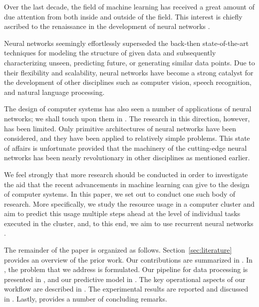 Over the last decade, the field of machine learning has received a great amount
of due attention from both inside and outside of the field. This interest is
chiefly ascribed to the renaissance in the development of neural networks
\cite{goodfellow2016}.

Neural networks seemingly effortlessly superseded the back-then state-of-the-art
techniques for modeling the structure of given data and subsequently
characterizing unseen, predicting future, or generating similar data points. Due
to their flexibility and scalability, neural networks have become a strong
catalyst for the development of other disciplines such as computer vision,
speech recognition, and natural language processing.

The design of computer systems has also seen a number of applications of neural
networks; we shall touch upon them in . The research in this
direction, however, has been limited. Only primitive architectures of neural
networks have been considered, and they have been applied to relatively simple
problems. This state of affairs is unfortunate provided that the machinery of
the cutting-edge neural networks has been nearly revolutionary in other
disciplines as mentioned earlier.

We feel strongly that more research should be conducted in order to investigate
the aid that the recent advancements in machine learning can give to the design
of computer systems. In this paper, we set out to conduct one such body of
research. More specifically, we study the resource usage in a computer cluster
and aim to predict this usage multiple steps ahead at the level of individual
tasks executed in the cluster, and, to this end, we aim to use recurrent neural
networks \cite{goodfellow2016}.

The remainder of the paper is organized as follows. Section~\ref{sec:literature}
provides an overview of the prior work. Our contributions are summarized in
. In , the problem that we address is
formulated. Our pipeline for data processing is presented in , and
our predictive model in . The key operational aspects of our
workflow are described in . The experimental results are
reported and discussed in . Lastly,  provides a
number of concluding remarks.

